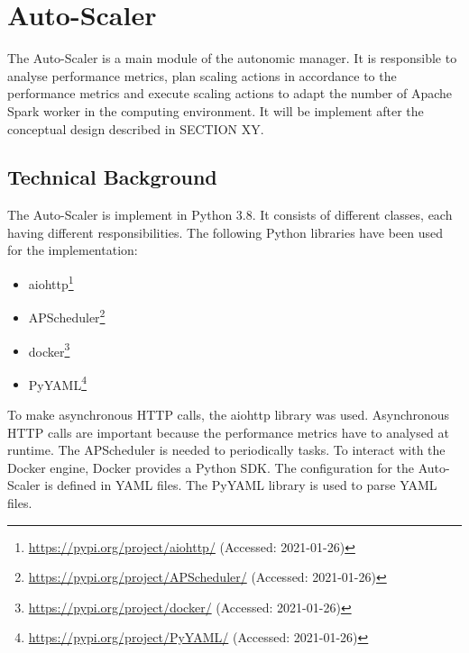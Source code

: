 \section{Auto-Scaler}
The Auto-Scaler is a main module of the autonomic manager. It is responsible to analyse performance metrics, plan scaling actions in accordance to the performance metrics and execute scaling actions to adapt the number of Apache Spark worker in the computing environment.
It will be implement after the conceptual design described in SECTION XY.


\subsection{Technical Background}
The Auto-Scaler is implement in Python 3.8. It consists of different classes, each having different responsibilities.
The following Python libraries have been used for the implementation:
\begin{itemize}
\item aiohttp\footnote{\url{https://pypi.org/project/aiohttp/} (Accessed: 2021-01-26)}
\item APScheduler\footnote{\url{https://pypi.org/project/APScheduler/} (Accessed: 2021-01-26)}
\item docker\footnote{\url{https://pypi.org/project/docker/} (Accessed: 2021-01-26)}
\item PyYAML\footnote{\url{https://pypi.org/project/PyYAML/} (Accessed: 2021-01-26)}
\end{itemize}
To make asynchronous HTTP calls, the aiohttp library was used. Asynchronous HTTP calls are important because the performance metrics have to analysed at runtime.
The APScheduler is needed to periodically tasks.
To interact with the Docker engine, Docker provides a Python SDK.
The configuration for the Auto-Scaler is defined in YAML files. The PyYAML library is used to parse YAML files.





